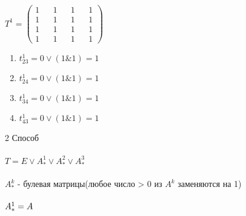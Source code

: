 \documentclass{article}
\begin{document}
$T^{1} =
  \begin{pmatrix}
  1 && 1 && 1 && 1 \\
  1 && 1 && 1 && 1 \\
  1 && 1 && 1 && 1 \\
  1 && 1 && 1 && 1
  \end{pmatrix}
$
  \begin{enumerate}[label=]
  \item $t^{1}_{23} = 0 \lor (1 \& 1) = 1$
  \item $t^{1}_{24} = 0 \lor (1 \& 1) = 1$
  \item $t^{1}_{34} = 0 \lor (1 \& 1) = 1$
  \item $t^{1}_{43} = 0 \lor (1 \& 1) = 1$
  \end{enumerate}
2 Способ
\\\\
$
T = E \lor A^{1}_{*} \lor A^{2}_{*} \lor A^{3}_{*}
$
\\\\
$A^{k}_{*}$ - булевая матрицы(любое число > 0 из $A^{k}$ заменяются на 1)\\
\\
$
A^{1}_{*} = A\\
$
\end{document}
